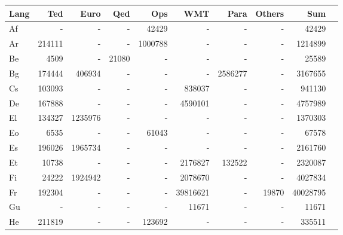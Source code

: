 \documentclass[11pt,a4paper]{article}
\begin{document}
\begin{table*}[htb]
\begin{tabular}{lrrrrrrrrr}
\toprule
 {\textbf{Lang}}&
  {\textbf{Ted}}    & {\textbf{Euro}} & {\textbf{Qed}}    & {\textbf{Ops}} & {\textbf{WMT}}   & {\textbf{Para}} & {\textbf{Others}} & {\textbf{Sum}}  \\

\midrule
Af   & -      & -        & -      & 42429         & -        & -         &        -            & 42429     \\ 
Ar   & 214111 & -        & -      & 1000788       & -        & -         &          -                  & 1214899   \\ 
Be   & 4509   & -        & 21080  & -             & -        & -         &          -                  & 25589     \\ 
Bg   & 174444 & 406934   & -      & -             & -        & 2586277   &          -                  & 3167655   \\ 
Cs   & 103093 & -        & -      & -             & 838037   & -         &            -                & 941130    \\ 
De   & 167888 & -        & -      & -             & 4590101  & -         &           -                 & 4757989   \\ 
El   & 134327 & 1235976  & -      & -             & -        & -         &            -                & 1370303   \\ 
Eo   & 6535   & -        & -      & 61043         & -        & -         &           -                 & 67578     \\ 
Es   & 196026 & 1965734  & -      & -             & -        & -         &          -                  & 2161760   \\ 
Et   & 10738  & -        & -      & -             & 2176827  & 132522    &          -                  & 2320087   \\ 
Fi   & 24222  & 1924942  & -      & -             & 2078670  & -         &          -                  & 4027834   \\ 
Fr   & 192304 & -        & -      & -             & 39816621 & -         & 19870 & 40028795  \\ 
Gu   & -      & -        & -      & -             & 11671    & -         &          -                  & 11671     \\ 
He   & 211819 & -        & -      & 123692        & -        & -         &         -                   & 335511    \\ 

\end{tabular}
\end{table*}
\end{document}
